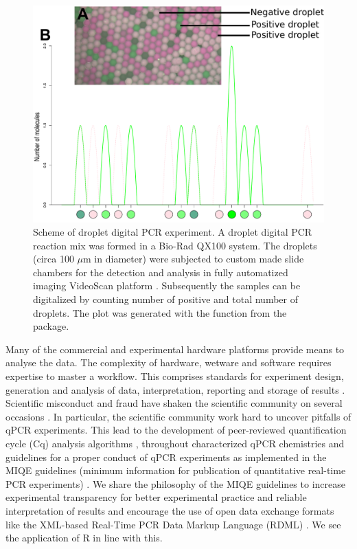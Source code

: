 \begin{figure}[htbp]
  \centering
  \includegraphics[clip=true, width=14cm]{figures/dpcR_sim.pdf}
  \caption{Scheme of droplet digital PCR experiment.  A droplet 
digital PCR reaction mix was formed in a Bio-Rad QX100 system. The droplets 
(circa 100 $\mu$m in diameter) were subjected to custom made slide chambers for 
the detection and analysis in fully automatized imaging VideoScan platform
\citep{rodiger_highly_2013}.  Subsequently the samples can be 
digitalized by counting number of positive and total number of droplets. The 
plot was generated with the  function from the  
package.}
\label{figure:dpcR_sim}
\end{figure}

Many of the commercial and experimental hardware platforms provide means to 
analyse the data. The complexity of hardware, wetware and software requires 
expertise to master a workflow. This comprises standards for experiment design, 
generation and analysis of data, interpretation, reporting and storage of 
results \citep{huggett_BDQ_2014}. Scientific misconduct and fraud have shaken 
the scientific community on several occasions \citep{fang_2012}. In particular, 
the scientific community work hard to uncover pitfalls of qPCR experiments. This 
lead to the development of peer-reviewed quantification cycle (Cq) analysis 
algorithms \citep{ruijter_2013}, throughout characterized qPCR chemistries 
\citep{ruijter_2014} and guidelines for a proper conduct of qPCR experiments as 
implemented in the MIQE guidelines (minimum information for publication of 
quantitative real-time PCR experiments) \citep{bustin_miqe_2009, huggett_2013}. 
We share the philosophy of the MIQE guidelines to increase experimental 
transparency for better experimental practice and reliable interpretation of 
results and encourage the use of open data exchange formats like the XML-based 
Real-Time PCR Data Markup Language (RDML) \citep{lefever_2009}. We see the 
application of R in line with this. 

